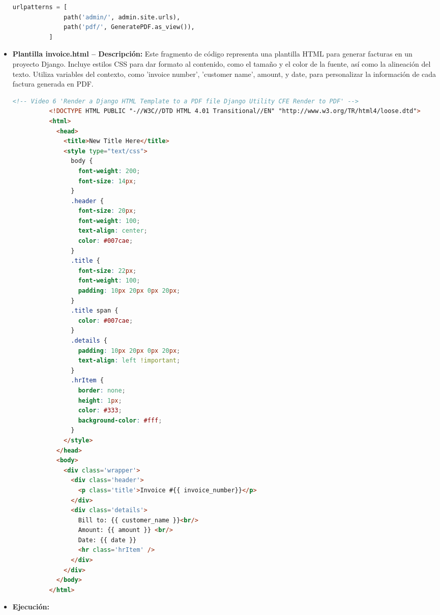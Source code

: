 \documentclass{article}
\begin{document}
\begin{itemize}
\begin{lstlisting}[language=Python]
          urlpatterns = [
              path('admin/', admin.site.urls),
              path('pdf/', GeneratePDF.as_view()),
          ]
        \end{lstlisting}
      \item \textbf{Plantilla invoice.html -- Descripción: }Este fragmento de código representa una plantilla HTML para generar 
        facturas en un proyecto Django. Incluye estilos CSS para dar formato al contenido, como el tamaño y el color de la fuente, 
        así como la alineación del texto. Utiliza variables del contexto, como 'invoice number', 'customer name', amount, y date, 
        para personalizar la información de cada factura generada en PDF.
        \begin{lstlisting}[language=HTML]
          <!-- Video 6 'Render a Django HTML Template to a PDF file Django Utility CFE Render to PDF' -->
          <!DOCTYPE HTML PUBLIC "-//W3C//DTD HTML 4.01 Transitional//EN" "http://www.w3.org/TR/html4/loose.dtd">
          <html>
            <head>
              <title>New Title Here</title>
              <style type="text/css">
                body {
                  font-weight: 200;
                  font-size: 14px;
                }
                .header {
                  font-size: 20px;
                  font-weight: 100;
                  text-align: center;
                  color: #007cae;
                }
                .title {
                  font-size: 22px;
                  font-weight: 100;
                  padding: 10px 20px 0px 20px;
                }
                .title span {
                  color: #007cae;
                }
                .details {
                  padding: 10px 20px 0px 20px;
                  text-align: left !important;
                }
                .hrItem {
                  border: none;
                  height: 1px;
                  color: #333;
                  background-color: #fff;
                }
              </style>
            </head>
            <body>
              <div class='wrapper'>
                <div class='header'>
                  <p class='title'>Invoice #{{ invoice_number}}</p>
                </div>
                <div class='details'>
                  Bill to: {{ customer_name }}<br/>
                  Amount: {{ amount }} <br/>
                  Date: {{ date }}
                  <hr class='hrItem' />
                </div>
              </div>
            </body>
          </html>
        \end{lstlisting}
      \newpage
      \item \textbf{Ejecución: }

\end{itemize}
\end{document}
